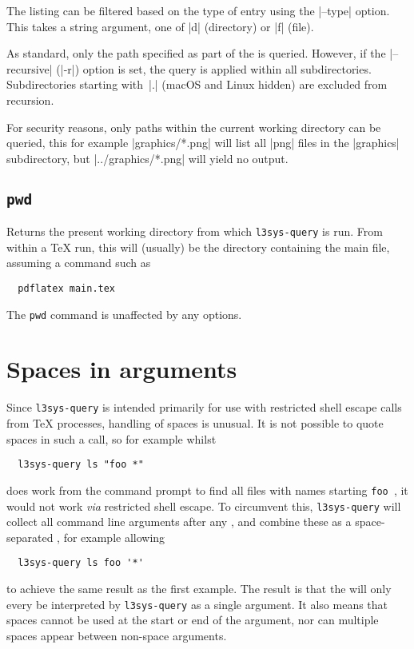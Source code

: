 \documentclass{l3doc}
\begin{document}
\begin{documentation}
The listing can be filtered based on the type of entry using the |--type|
option. This takes a string argument, one of |d| (directory) or |f| (file).

As standard, only the path specified as part of the  is queried.
However, if the |--recursive| (|-r|) option is set, the query is applied within
all subdirectories. Subdirectories starting with~|.| (macOS and Linux hidden)
are excluded from recursion.

For security reasons, only paths within the current working directory can be
queried, this for example |graphics/*.png| will list all |png| files in the
|graphics| subdirectory, but |../graphics/*.png| will yield no output.

\subsection{\texttt{pwd}}

Returns the present working directory from which \texttt{l3sys-query} is run.
From within a \TeX{} run, this will (usually) be the directory containing the
main file, assuming a command such as
\begin{verbatim}
  pdflatex main.tex
\end{verbatim}
The \texttt{pwd} command is unaffected by any options.

\section{Spaces in arguments}

Since \texttt{l3sys-query} is intended primarily for use with restricted shell
escape calls from \TeX{} processes, handling of spaces is unusual. It is not
possible to quote spaces in such a call, so for example whilst
\begin{verbatim}
  l3sys-query ls "foo *"
\end{verbatim}
does work from the command prompt to find all files with names starting
\verb*|foo |, it would not work \emph{via} restricted shell escape. To
circumvent this, \texttt{l3sys-query} will collect all command line arguments
after any , and combine these as a space-separated ,
for example allowing
\begin{verbatim}
  l3sys-query ls foo '*'
\end{verbatim}
to achieve the same result as the first example. The result is that the
 will only every be interpreted by \texttt{l3sys-query} as a single
argument. It also means that spaces cannot be used at the start or end of the
argument, nor can multiple spaces appear between non-space arguments.


\end{documentation}
\end{document}
